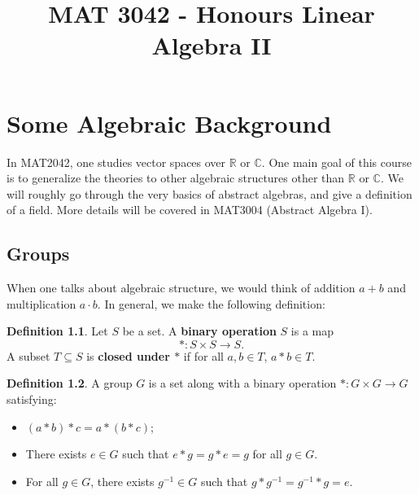 \documentclass[11pt,openany]{book}
\title{MAT 3042 - Honours Linear Algebra II}
\date{}
\theoremstyle{plain}
\theoremstyle{definition}
\newtheorem{definition}[definition]{Definition}
\theoremstyle{remark}
\begin{document}
\maketitle
\tableofcontents


\chapter{Some Algebraic Background}
In MAT2042, one studies vector spaces over $\mathbb{R}$ or $\mathbb{C}$. One main goal of this course is to generalize the theories to other algebraic structures other than $\mathbb{R}$ or $\mathbb{C}$. We will roughly go through the very basics of abstract algebras, and give a definition of a field. More details will be covered in MAT3004 (Abstract Algebra I). 

\section{Groups}
When one talks about algebraic structure, we would think of addition $a + b$ and multiplication $a \cdot b$. In general, we make the following definition:
\begin{definition}
    Let $S$ be a set. A {\bf binary operation} $S$ is a map
    $$\ast: S \times S \to S.$$
    A subset $T \subseteq S$ is {\bf closed under $\ast$} if for all $a, b \in T$, $a \ast b \in T$.
\end{definition}

\begin{definition} \label{def-group}
    A group $G$ is a set along with a binary operation $\ast: G \times G \to G$ satisfying:
    \begin{itemize}
        \item $(a \ast b) \ast c = a \ast (b \ast c)$;
        \item There exists $e\in G$ such that $e \ast g = g \ast e = g$ for all $g \in G$.
        \item For all $g \in G$, there exists $g^{-1} \in G$ such that $g \ast g^{-1} = g^{-1} \ast g = e$.
    \end{itemize}
\end{definition}
\end{document}
